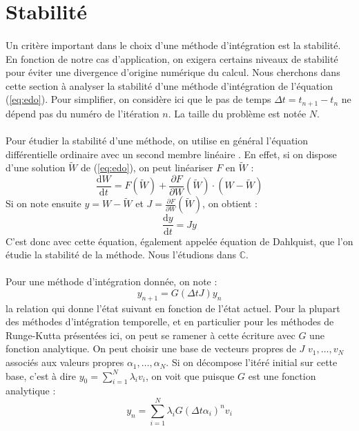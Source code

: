   \section{Stabilité}

    \paragraph{}
    Un critère important dans le choix d'une méthode d'intégration est la stabilité.
    En fonction de notre cas d'application, on exigera certains niveaux de stabilité pour éviter une divergence d'origine numérique du calcul.
    Nous cherchons dans cette section à analyser la stabilité d'une méthode d'intégration de l'équation (\ref{eq:edo}).
    Pour simplifier, on considère ici que le pas de temps $\Delta t = t_{n+1} - t_n$ ne dépend pas du numéro de l'itération $n$.
    La taille du problème est notée $N$.

    \paragraph{}
    Pour étudier la stabilité d'une méthode, on utilise en général l'équation différentielle ordinaire avec un second membre linéaire \cite{HairerWanner1996}.
    En effet, si on dispose d'une solution $\tilde{W}$ de (\ref{eq:edo}), on peut linéariser $F$ en $\tilde{W}$ :
    \[\frac{\mathrm{d}W}{\mathrm{d}t} = F\left(\tilde{W}\right) + \frac{\partial F}{\partial W}\left(\tilde{W}\right)\cdot\left(W - \tilde{W}\right)\]
    Si on note ensuite $y = W - \tilde{W}$ et $J = \frac{\partial F}{\partial W}\left(\tilde{W}\right)$, on obtient :
    \begin{equation}\label{eq:stab}
      \frac{\mathrm{d}y}{\mathrm{d}t} = Jy
    \end{equation}
    C'est donc avec cette équation, également appelée équation de Dahlquist, que l'on étudie la stabilité de la méthode.
    Nous l'étudions dans $\mathbb{C}$.

    \paragraph{}
    Pour une méthode d'intégration donnée, on note :
    \begin{equation}\label{eq:stab_req}
      y_{n+1} = G\left(\Delta tJ\right)y_n
    \end{equation}
    la relation qui donne l'état suivant en fonction de l'état actuel.
    Pour la plupart des méthodes d'intégration temporelle, et en particulier pour les méthodes de Runge-Kutta présentées ici, on peut se ramener à cette écriture avec $G$ une fonction analytique.
    On peut choisir une base de vecteurs propres de $J$ $v_1, \dots, v_N$ associés aux valeurs propres $\alpha_1, \dots, \alpha_N$.
    Si on décompose l'itéré initial sur cette base, c'est à dire $y_0 = \sum_{i=1}^N\lambda_iv_i$, on voit que puisque $G$ est une fonction analytique :
    \[y_n = \sum_{i=1}^N\lambda_iG\left(\Delta t\alpha_i\right)^nv_i\]


